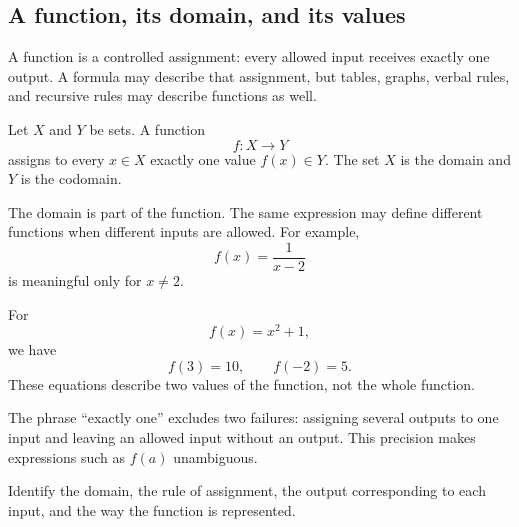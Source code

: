 \subsection{A function, its domain, and its values}

\begin{corebox}
A function is a controlled assignment: every allowed input receives exactly one output. A formula may describe that assignment, but tables, graphs, verbal rules, and recursive rules may describe functions as well.
\end{corebox}

\begin{definitionbox}[Function]
Let $X$ and $Y$ be sets. A function
\[
f:X\to Y
\]
assigns to every $x\in X$ exactly one value $f(x)\in Y$. The set $X$ is the domain and $Y$ is the codomain.
\end{definitionbox}

The domain is part of the function. The same expression may define different functions when different inputs are allowed. For example,
\[
f(x)=\frac{1}{x-2}
\]
is meaningful only for $x\neq2$.

\begin{examplebox}
For
\[
f(x)=x^2+1,
\]
we have
\[
f(3)=10,
\qquad
f(-2)=5.
\]
These equations describe two values of the function, not the whole function.
\end{examplebox}

\begin{interpretationbox}
The phrase ``exactly one'' excludes two failures: assigning several outputs to one input and leaving an allowed input without an output. This precision makes expressions such as $f(a)$ unambiguous.
\end{interpretationbox}

\begin{summarybox}
Identify the domain, the rule of assignment, the output corresponding to each input, and the way the function is represented.
\end{summarybox}

